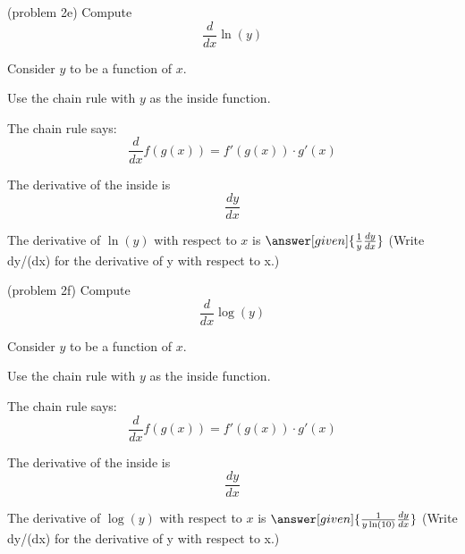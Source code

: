 \documentclass{ximera}
\begin{document}
\begin{problem}(problem 2e)
  Compute
  \[
  \frac{d}{dx} \ln(y)
  \]
  
	  
    \begin{hint}
      Consider $y$ to be a function of $x$.
    \end{hint}
    \begin{hint}
      Use the chain rule with $y$ as the inside function.
    \end{hint}
    \begin{hint}
      The chain rule says:
      \[
      \frac{d}{dx} f(g(x)) = f'(g(x))\cdot g'(x)
      \]
    \end{hint}
    \begin{hint}
      The derivative of the inside is 
      \[
      \frac{dy}{dx}
      \]
    \end{hint}
    
		The derivative of $\ln(y)$ with respect to $x$ is
		 $\answer[given]{\frac{1}{y} \frac{dy}{dx}}$  (Write dy/(dx) for the derivative of y with respect to x.)
		
\end{problem}


\begin{problem}(problem 2f)
  Compute
  \[
  \frac{d}{dx} \log(y)
  \]
  
	  
    \begin{hint}
      Consider $y$ to be a function of $x$.
    \end{hint}
    \begin{hint}
      Use the chain rule with $y$ as the inside function.
    \end{hint}
    \begin{hint}
      The chain rule says:
      \[
      \frac{d}{dx} f(g(x)) = f'(g(x))\cdot g'(x)
      \]
    \end{hint}
    \begin{hint}
      The derivative of the inside is 
      \[
      \frac{dy}{dx}
      \]
    \end{hint}
    
		The derivative of $\log(y)$ with respect to $x$ is
		 $\answer[given]{\frac{1}{y \ln(10)} \frac{dy}{dx}}$  (Write dy/(dx) for the derivative of y with respect to x.)
		
\end{problem}
\end{document}
